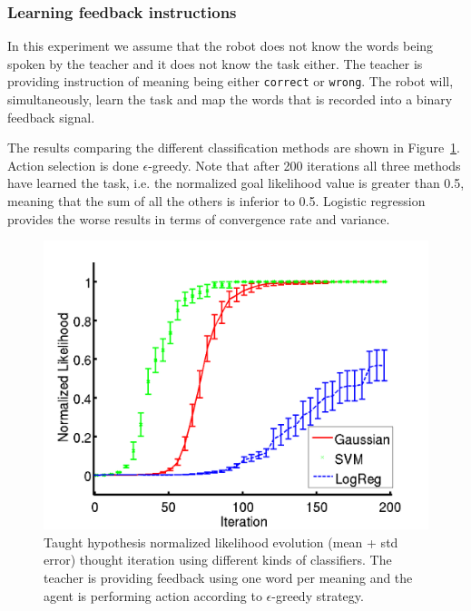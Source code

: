 \subsubsection{Learning feedback instructions}
%
In this experiment we assume that the robot does not know the words being spoken by the teacher and it does not know the task either. The teacher is providing instruction of meaning being either \texttt{correct} or \texttt{wrong}. The robot will, simultaneously, learn the task and map the words that is recorded into a binary feedback signal.

The results comparing the different classification methods are shown in Figure~\ref{fig:FeedbackOneWord}. Action selection is done $\epsilon$-greedy. Note that after 200 iterations all three methods have learned the task, i.e. the normalized goal likelihood value is greater than 0.5, meaning that the sum of all the others is inferior to 0.5. Logistic regression provides the worse results in terms of convergence rate and variance.
%
\begin{figure}[!htbp]
	\centering
		\includegraphics[width=\ww\columnwidth]{images/results/classifiers}
	\caption{Taught hypothesis normalized likelihood evolution (mean + std error) thought iteration using different kinds of classifiers. The teacher is providing feedback using one word per meaning and the agent is performing action according to $\epsilon$-greedy strategy.}
	\label{fig:FeedbackOneWord}
\end{figure}

